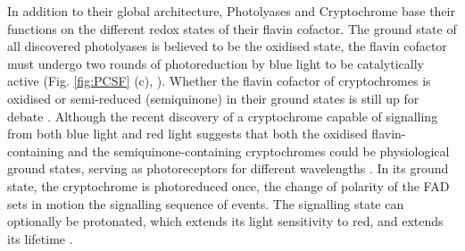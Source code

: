 In addition to their global architecture, Photolyases and Cryptochrome base their functions on the different redox states of their flavin cofactor. The ground state of all discovered photolyases is believed to be the oxidised state, the flavin cofactor must undergo two rounds of photoreduction by blue light to be catalytically active (Fig. \ref{fig:PCSF} (c), \cite{liuDynamicsMechanismsDNA2015}). Whether the flavin cofactor of cryptochromes is oxidised or semi-reduced (semiquinone) in their ground states is still up for debate \parencite{berndtNovelPhotoreactionMechanism2007, ozturkMechanismPhotosignalingDrosophila2014}. Although the recent discovery of a cryptochrome capable of signalling from both blue light and red light \parencite{beelFlavinBindingCryptochrome2012} suggests that both the oxidised flavin-containing and the semiquinone-containing cryptochromes could be physiological ground states, serving as photoreceptors for different wavelengths \parencite{kavakliPhotolyaseCryptochromeFamily2017}. In its ground state, the cryptochrome is photoreduced once, the change of polarity of the FAD sets in motion the signalling sequence of events. The signalling state can optionally be protonated, which extends its light sensitivity to red, and extends its lifetime \parencite{lacombatUltrafastOxidationTyrosine2019}.


